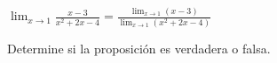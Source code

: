 \item $\displaystyle \lim_{x \to 1} \frac{x-3}{x^2+2x-4} = \frac{\lim_{x \to 1} (x-3)}{\lim_{x \to 1} (x^2+2x-4)}$
\par
Determine si la proposición es verdadera o falsa.
